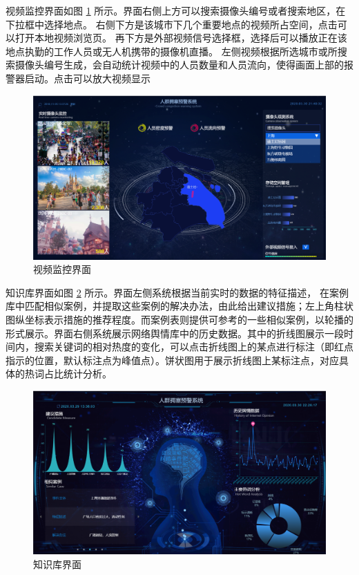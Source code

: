 \documentclass{ctexrep}
\begin{document}
视频监控界面如图 \ref{fig:video} 所示。界面右侧上方可以搜索摄像头编号或者搜索地区，在下拉框中选择地点。
右侧下方是该城市下几个重要地点的视频所占空间，点击可以打开本地视频浏览页。
再下方是外部视频信号选择框，选择后可以播放正在该地点执勤的工作人员或无人机携带的摄像机直播。
左侧视频根据所选城市或所搜索摄像头编号生成，会自动统计视频中的人员数量和人员流向，使得画面上部的报警器启动。点击可以放大视频显示
\begin{figure}[H]
	\centering
	\includegraphics[scale=0.5]{img/proto_video.png}
	\caption{\label{fig:video}视频监控界面}
\end{figure}

知识库界面如图 \ref{fig:db} 所示。界面左侧系统根据当前实时的数据的特征描述， 在案例库中匹配相似案例，并提取这些案例的解决办法，由此给出建议措施；左上角柱状图纵坐标表示措施的推荐程度。而案例表则提供可参考的一些相似案例，以轮播的形式展示。界面右侧系统展示网络舆情库中的历史数据。其中的折线图展示一段时间内，搜索关键词的相对热度的变化，可以点击折线图上的某点进行标注（即红点指示的位置，默认标注点为峰值点）。饼状图用于展示折线图上某标注点，对应具体的热词占比统计分析。
\begin{figure}[H]
	\centering
	\includegraphics[scale=0.5]{img/ptoto_db.png}
	\caption{\label{fig:db}知识库界面}
\end{figure}
\end{document}
